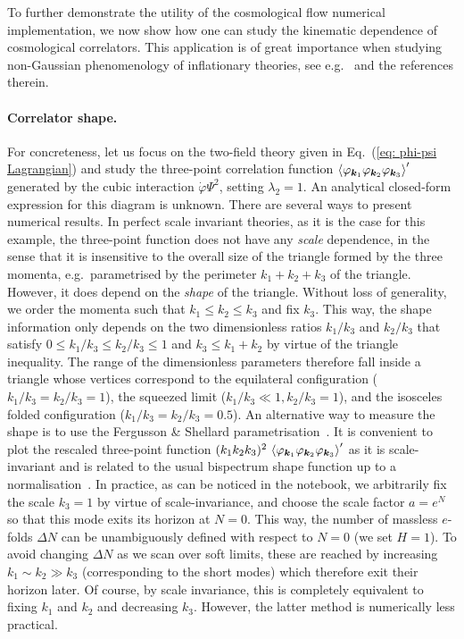 \documentclass[11pt]{article}
\numberwithin{equation}{section} %
\begin{document}
To further demonstrate the utility of the cosmological flow numerical implementation, we now show how one can study the kinematic dependence of cosmological correlators. This application is of great importance when studying non-Gaussian phenomenology of inflationary theories, see e.g.~\cite{Maldacena:2002vr, Creminelli:2003iq, Chen:2010xka, Renaux-Petel:2015bja, Meerburg:2019qqi} and the references therein.


\paragraph{Correlator shape.} For concreteness, let us focus on the two-field theory given in Eq.~(\ref{eq: phi-psi Lagrangian}) and study the three-point correlation function $\braket{\varphi_{\bm{k}_1} \varphi_{\bm{k}_2} \varphi_{\bm{k}_3}}'$ generated by the cubic interaction $\dot{\varphi}\Psi^2$, setting $\lambda_2=1$. An analytical closed-form expression for this diagram is unknown. There are several ways to present numerical results. In perfect scale invariant theories, as it is the case for this example, the three-point function does not have any \textit{scale} dependence, in the sense that it is insensitive to the overall size of the triangle formed by the three momenta, e.g.~parametrised by the perimeter $k_1+k_2+k_3$ of the triangle. However, it does depend on the \textit{shape} of the triangle. Without loss of generality, we order the momenta such that $k_1 \leq k_2 \leq k_3$ and fix $k_3$. This way, the shape information only depends on the two dimensionless ratios $k_1/k_3$ and $k_2/k_3$ that satisfy $0 \leq k_1/k_3 \leq k_2/k_3 \leq 1$ and $k_3 \leq k_1 + k_2$ by virtue of the triangle inequality. The range of the dimensionless parameters therefore fall inside a triangle whose vertices correspond to the equilateral configuration ($k_1/k_3 = k_2/k_3 = 1$), the squeezed limit ($k_1/k_3 \ll 1, k_2/k_3 = 1$), and the isosceles folded configuration ($k_1/k_3 = k_2/k_3 = 0.5$). An alternative way to measure the shape is to use the Fergusson \& Shellard parametrisation~\cite{Fergusson:2006pr}. It is convenient to plot the rescaled three-point function $(k_1 k_2 k_3)^2\,\braket{\varphi_{\bm{k}_1} \varphi_{\bm{k}_2} \varphi_{\bm{k}_3}}'$ as it is scale-invariant and is related to the usual bispectrum shape function up to a normalisation~\cite{Babich:2004gb}. In practice, as can be noticed in the notebook, we arbitrarily fix the scale $k_3=1$ by virtue of scale-invariance, and choose the scale factor $a=e^N$ so that this mode exits its horizon at $N=0$. This way, the number of massless $e$-folds $\Delta N$ can be unambiguously defined with respect to $N=0$ (we set $H=1$). To avoid changing $\Delta N$ as we scan over soft limits, these are reached by increasing $k_1\sim k_2 \gg k_3$ (corresponding to the short modes) which therefore exit their horizon later. Of course, by scale invariance, this is completely equivalent to fixing $k_1$ and $k_2$ and decreasing $k_3$. However, the latter method is numerically less practical.
\end{document}
